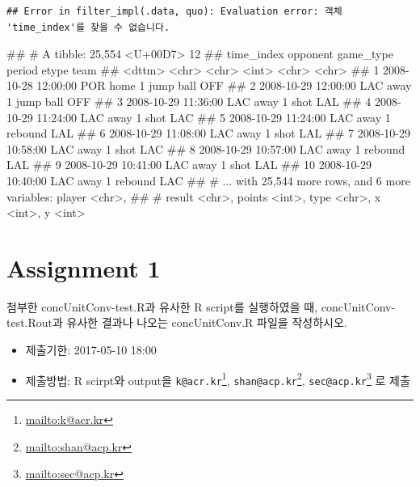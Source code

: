\documentclass[10pt,]{krantz}
\makeatletter
\newenvironment{Shaded}{\begin{snugshade}}{\end{snugshade}}
\newcommand{\NormalTok}[1]{#1}
\providecommand{\tightlist}{%
  \setlength{\itemsep}{0pt}\setlength{\parskip}{0pt}}
\renewcommand{\href}[2]{#2\footnote{\url{#1}}}
\newenvironment{kframe}{%
\medskip{}
\setlength{\fboxsep}{.8em}
 \def\at@end@of@kframe{}%
 \ifinner\ifhmode%
  \def\at@end@of@kframe{\end{minipage}}%
  \begin{minipage}{\columnwidth}%
 \fi\fi%
 \def\FrameCommand##1{\hskip\@totalleftmargin \hskip-\fboxsep
 \colorbox{shadecolor}{##1}\hskip-\fboxsep
     \hskip-\linewidth \hskip-\@totalleftmargin \hskip\columnwidth}%
 \MakeFramed {\advance\hsize-\width
   \@totalleftmargin\z@ \linewidth\hsize
   \@setminipage}}%
 {\par\unskip\endMakeFramed%
 \at@end@of@kframe}
\renewenvironment{Shaded}{\begin{kframe}}{\end{kframe}}
\makeatother
\begin{document}
\begin{verbatim}
## Error in filter_impl(.data, quo): Evaluation error: 객체 'time_index'를 찾을 수 없습니다.
\end{verbatim}

\begin{Shaded}
\begin{Highlighting}[]
\NormalTok{## # A tibble: 25,554 <U+00D7> 12}
\NormalTok{##             time_index opponent game_type period     etype  team}
\NormalTok{##                 <dttm>    <chr>     <chr>  <int>     <chr> <chr>}
\NormalTok{## 1  2008-10-28 12:00:00      POR      home      1 jump ball   OFF}
\NormalTok{## 2  2008-10-29 12:00:00      LAC      away      1 jump ball   OFF}
\NormalTok{## 3  2008-10-29 11:36:00      LAC      away      1      shot   LAL}
\NormalTok{## 4  2008-10-29 11:24:00      LAC      away      1      shot   LAC}
\NormalTok{## 5  2008-10-29 11:24:00      LAC      away      1   rebound   LAL}
\NormalTok{## 6  2008-10-29 11:08:00      LAC      away      1      shot   LAL}
\NormalTok{## 7  2008-10-29 10:58:00      LAC      away      1      shot   LAC}
\NormalTok{## 8  2008-10-29 10:57:00      LAC      away      1   rebound   LAL}
\NormalTok{## 9  2008-10-29 10:41:00      LAC      away      1      shot   LAL}
\NormalTok{## 10 2008-10-29 10:40:00      LAC      away      1   rebound   LAC}
\NormalTok{## # ... with 25,544 more rows, and 6 more variables: player <chr>,}
\NormalTok{## #   result <chr>, points <int>, type <chr>, x <int>, y <int>}
\end{Highlighting}
\end{Shaded}

\cleardoublepage 

\appendix {}


\section{Assignment 1}\label{assignment-1}

첨부한 concUnitConv-test.R과 유사한 R script를 실행하였을 때,
concUnitConv-test.Rout과 유사한 결과나 나오는 concUnitConv.R 파일을
작성하시오.

\begin{itemize}
\tightlist
\item
  제출기한: 2017-05-10 18:00
\item
  제출방법: R scirpt와 output을
  \href{mailto:k@acr.kr}{\nolinkurl{k@acr.kr}},
  \href{mailto:shan@acp.kr}{\nolinkurl{shan@acp.kr}},
  \href{mailto:sec@acp.kr}{\nolinkurl{sec@acp.kr}} 로 제출
\end{itemize}
\end{document}
